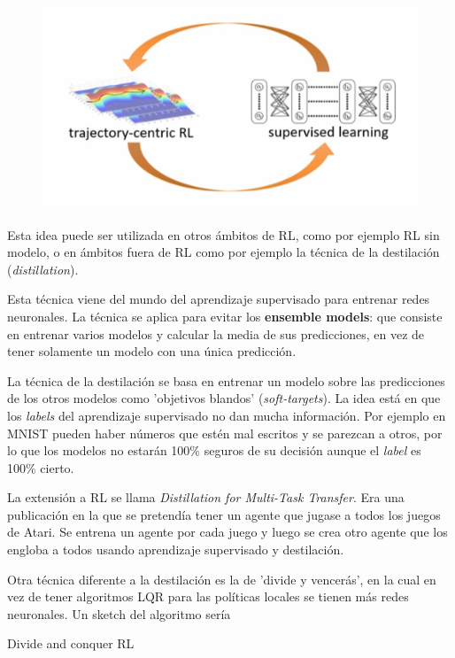 \begin{figure}[H]
	\centering
	\includegraphics[width=0.6\linewidth]{figures/2020-07-02-192432_487x263_scrot.png}
\end{figure}

Esta idea puede ser utilizada en otros ámbitos de RL, como por ejemplo RL sin modelo, o en
ámbitos fuera de RL como por ejemplo la técnica de la destilación
(\textit{distillation}).

Esta técnica viene del mundo del aprendizaje supervisado para entrenar redes neuronales. La
técnica se aplica para evitar los \textbf{ensemble models}: que consiste en entrenar varios modelos y calcular
la media de sus predicciones, en vez de tener solamente un modelo con una única predicción.

La técnica de la destilación se basa en entrenar un modelo sobre las predicciones de los
otros modelos como 'objetivos blandos' (\textit{soft-targets}). La idea está en que los
\textit{labels} del aprendizaje supervisado no dan mucha información. Por ejemplo en MNIST
pueden haber números que estén mal escritos y se parezcan a otros, por lo que los modelos no
estarán 100\% seguros de su decisión aunque el \textit{label} es 100\% cierto.

La extensión a RL se llama \textit{Distillation for Multi-Task Transfer}. Era una publicación
en la que se pretendía tener un agente que jugase a todos los juegos de Atari. Se entrena un
agente por cada juego y luego se crea otro agente que los engloba a todos usando aprendizaje
supervisado y destilación.

Otra técnica diferente a la destilación es la de 'divide y vencerás', en la cual en vez de tener
algoritmos LQR para las políticas locales se tienen más redes neuronales. Un sketch del algoritmo
sería
\begin{algorithm}
    \caption{Divide and conquer RL}
\end{algorithm}

